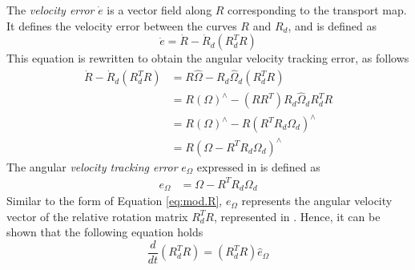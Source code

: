 
The \textit{velocity error} $ \dot{e} $ is a vector field along $ R $ corresponding to the transport map.
It defines the velocity error between the curves $ R$ and $ R_d$, and is defined as
\begin{equation}\label{eq:con.dote}
\dot{e}=\dot{R}-\dot{R}_d(R_d^TR)
\end{equation}
This equation is rewritten to obtain the angular velocity tracking error, as follows
\begin{equation}\label{key}
\begin{aligned}
\dot{R}-\dot{R}_d(R_d^TR) &=R\hat{\Omega}-R_d\hat{\Omega}_d(R_d^TR) \\
&=R(\Omega)^\wedge-(RR^T)R_d\hat{\Omega}_dR_d^TR\\
&=R(\Omega)^\wedge-R(R^TR_d{\Omega}_d)^\wedge \\
&=R(\Omega-R^TR_d{\Omega}_d)^\wedge 
\end{aligned}
\end{equation}
The angular \textit{velocity tracking error} $ e_{\Omega} $ expressed in \BF  is defined as
\begin{align}\label{eq:con.eOmega}
e_\Omega&=\Omega- R^TR_d\Omega_d
\end{align}
Similar to the form of Equation \ref{eq:mod.R}, $ e_\Omega $ represents the angular velocity vector of the relative rotation matrix $ R_d^TR $, represented in \BF. Hence, it can be shown that the following equation holds
\begin{equation}\label{key}
\frac{d}{dt}(R^T_dR)=(R_d^TR)\hat{e}_\Omega
\end{equation}
%
%

